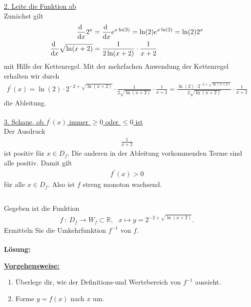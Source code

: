 \underline{2. Leite die Funktion ab}\\
Zunächst gilt
\begin{align*}
\frac{\text{\rmfamily d}  \ }{\text{\rmfamily d} x} 2^x
&= 
\frac{\text{\rmfamily d}  \ }{\text{\rmfamily d} x}e^{x \ln(2)}
=
\ln(2) e^{x\ln(2)} = \ln(2) 2^x\\
\frac{\text{\rmfamily d}  \ }{\text{\rmfamily d} x} \sqrt{\ln(x+2)}
&= \frac{1}{2 \ln(x+2)} \cdot \frac{1}{x+2}
\end{align*}
mit Hilfe der Kettenregel.
Mit der mehrfachen Anwendung der Kettenregel erhalten wir durch
\begin{align*}
f^{\prime}(x) =
\ln(2) \cdot 2^{-2 + \sqrt{\ln(x+2)}} 
\cdot \frac{1}{2 \sqrt{\ln(x+2)}} \cdot \frac{1}{x+2}
=
\frac{\ln(2) \cdot 2^{-2 + \sqrt{\ln(x+2)}}}{2 \sqrt{\ln(x+2)}} \cdot \frac{1}{x+2}
\end{align*}
die Ableitung.
\\
\\

\underline{3. Schaue, ob $f^\prime(x)$ immer $\geq 0$ oder $\leq 0$ ist}\\
Der Ausdruck
\begin{align*}
\frac{1}{x+2}
\end{align*}
ist positiv für $x \in D_f$.
Die anderen in der Ableitung vorkommenden Terme sind alle positiv.
Damit gilt
\begin{align*}
f^\prime(x) > 0
\end{align*}
für alle $x \in D_f$.
Also ist $f$ streng monoton wachsend.

\newpage

\subsection*{}
Gegeben ist die Funktion
\begin{align*}
f \ : \ D_f \to W_f \subset \mathbb{R}, \ \ \
x \mapsto y = 2^{-2 + \sqrt{\ln(x+2)}}. 
\end{align*}
Ermitteln Sie die Umkehrfunktion $f^{-1}$ von $f$.
\\
\\
\textbf{Lösung:}
\begin{mdframed}
\underline{\textbf{Vorgehensweise:}}
\begin{enumerate}
\item Überlege dir, wie der Definitions-und Wertebereich von $f^{-1}$ aussieht.
\item Forme $y = f(x)$ nach $x$ um.
\end{enumerate}
\end{mdframed}

